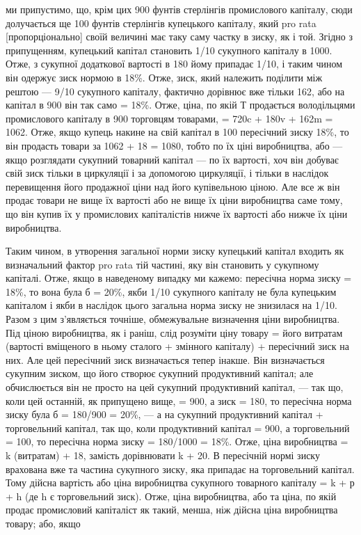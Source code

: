 \parcont{}  %
ми припустимо, що, крім цих 900 фунтів стерлінгів промислового
капіталу, сюди долучається ще 100 фунтів стерлінгів купецького
капіталу, який pro rata [пропорціонально] своїй величині має
таку саму частку в зиску, як і той. Згідно з припущенням,
купецький капітал становить 1/10 сукупного капіталу в 1000.
Отже, з сукупної додаткової вартості в 180 йому припадає 1/10,
і таким чином він одержує зиск нормою в 18\%. Отже, зиск,
який належить поділити між рештою — 9/10 сукупного капіталу,
фактично дорівнює вже тільки 162, або на капітал в 900 він так
само = 18\%. Отже, ціна, по якій Т продається володільцями промислового
капіталу в 900 торговцям товарами, = 720c + 180v + 162m = 1062.
Отже, якщо купець накине на свій капітал
в 100 пересічний зиску 18\%, то він продасть товари за 1062 + 18 = 1080,
тобто по їх ціні виробництва, або — якщо розглядати
сукупний товарний капітал — по їх вартості, хоч він добуває
свій зиск тільки в циркуляції і за допомогою циркуляції, і тільки
в наслідок перевищення його продажної ціни над його купівельною
ціною. Але все ж він продає товари не вище їх вартості
або не вище їх ціни виробництва саме тому, що він купив їх
у промислових капіталістів нижче їх вартості або нижче їх ціни
виробництва.

Таким чином, в утворення загальної норми зиску купецький
капітал входить як визначальний фактор pro rata тій частині,
яку він становить у сукупному капіталі. Отже, якщо в наведеному
випадку ми кажемо: пересічна норма зиску = 18\%, то вона
була б = 20\%, якби 1/10 сукупного капіталу не була купецьким
капіталом і якби в наслідок цього загальна норма зиску не знизилася
на 1/10. Разом з цим з’являється точніше, обмежувальне визначення
ціни виробництва. Під ціною виробництва, як і раніш,
слід розуміти ціну товару = його витратам (вартості вміщеного
в ньому сталого + змінного капіталу) + пересічний зиск на них.
Але цей пересічний зиск визначається тепер інакше. Він визначається
сукупним зиском, що його створює сукупний продуктивний
капітал; але обчислюється він не просто на цей сукупний
продуктивний капітал, — так що, коли цей останній, як
припущено вище, = 900, а зиск = 180, то пересічна норма зиску
була б = 180/900 = 20\%, — а на сукупний продуктивний капітал + торговельний
капітал, так що, коли продуктивний капітал = 900, а торговельний = 100, то пересічна норма зиску =
180/1000 = 18\%.
Отже, ціна виробництва = k (витратам) + 18, замість дорівнювати
k + 20. В пересічній нормі зиску врахована вже та частина
сукупного зиску, яка припадає на торговельний капітал. Тому
дійсна вартість або ціна виробництва сукупного товарного капіталу
= k + р + h (де h є торговельний зиск). Отже, ціна виробництва,
або та ціна, по якій продає промисловий капіталіст як
такий, менша, ніж дійсна ціна виробництва товару; або, якщо
\parbreak{}  %
